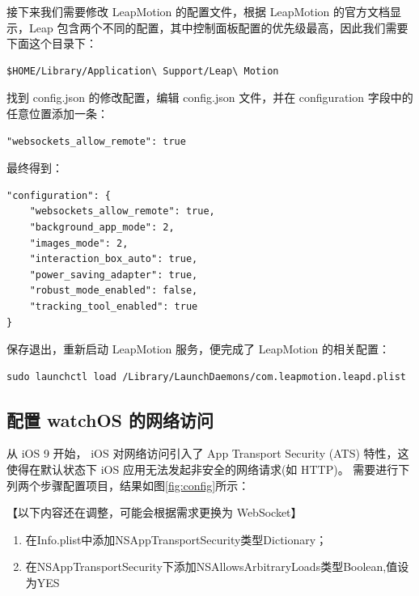 接下来我们需要修改 LeapMotion 的配置文件，根据 LeapMotion 的官方文档显示，Leap 包含两个不同的配置，其中控制面板配置的优先级最高，因此我们需要下面这个目录下：
\begin{lstlisting}[frame=trBL,frameround=fttt,rulesepcolor=\color{White},numbers=none]
$HOME/Library/Application\ Support/Leap\ Motion
\end{lstlisting}

找到 config.json 的修改配置，编辑 config.json 文件，并在 configuration 字段中的任意位置添加一条：
\begin{lstlisting}[frame=trBL,frameround=fttt,rulesepcolor=\color{White},numbers=none]
"websockets_allow_remote": true
\end{lstlisting}

最终得到：

\begin{lstlisting}[frame=trBL,frameround=fttt,rulesepcolor=\color{White},numbers=none]
"configuration": {
    "websockets_allow_remote": true,
    "background_app_mode": 2,
    "images_mode": 2,
    "interaction_box_auto": true,
    "power_saving_adapter": true,
    "robust_mode_enabled": false,
    "tracking_tool_enabled": true
}
\end{lstlisting}

保存退出，重新启动 LeapMotion 服务，便完成了 LeapMotion 的相关配置：

\begin{lstlisting}[frame=trBL,frameround=fttt,rulesepcolor=\color{White},numbers=none]
sudo launchctl load /Library/LaunchDaemons/com.leapmotion.leapd.plist
\end{lstlisting}

\subsection{配置 watchOS 的网络访问}

从 iOS 9 开始， iOS 对网络访问引入了 App Transport Security (ATS) 特性，这使得在默认状态下 iOS 应用无法发起非安全的网络请求(如 HTTP)。
需要进行下列两个步骤配置项目，结果如图\ref{fig:config}所示：

【以下内容还在调整，可能会根据需求更换为 WebSocket】
\begin{enumerate}
    \item 在Info.plist中添加NSAppTransportSecurity类型Dictionary；
    \item 在NSAppTransportSecurity下添加NSAllowsArbitraryLoads类型Boolean,值设为YES
\end{enumerate}

